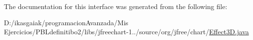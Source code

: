 The documentation for this interface was generated from the following file\+:\begin{DoxyCompactItemize}
\item 
D\+:/ikasgaiak/programacion\+Avanzada/\+Mis Ejercicios/\+P\+B\+Ldefinitibo2/libs/jfreechart-\/1../source/org/jfree/chart/\mbox{\hyperlink{_effect3_d_8java}{Effect3\+D.\+java}}\end{DoxyCompactItemize}
